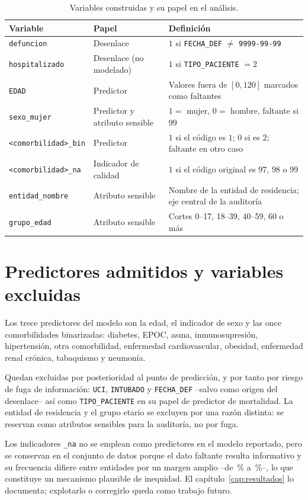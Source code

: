 \begin{table}[htbp]
\centering
\caption{Variables construidas y su papel en el análisis.}
\label{tab:derivadas}
\small
\setlength{\tabcolsep}{4pt}
\begin{tabular}{p{3.5cm} p{3.2cm} p{7.4cm}}
\toprule
Variable & Papel & Definición \\
\midrule
\texttt{defuncion} & Desenlace &
$1$ si \texttt{FECHA\_DEF} $\neq$ \texttt{9999-99-99} \\
\texttt{hospitalizado} & Desenlace (no modelado) &
$1$ si \texttt{TIPO\_PACIENTE} $=2$ \\
\texttt{EDAD} & Predictor &
Valores fuera de $[0,120]$ marcados como faltantes \\
\texttt{sexo\_mujer} & Predictor y atributo sensible &
$1=$ mujer, $0=$ hombre, faltante si $99$ \\
\texttt{<comorbilidad>\_bin} & Predictor &
$1$ si el código es $1$; $0$ si es $2$; faltante en otro caso \\
\texttt{<comorbilidad>\_na} & Indicador de calidad &
$1$ si el código original es $97$, $98$ o $99$ \\
\texttt{entidad\_nombre} & Atributo sensible &
Nombre de la entidad de residencia; eje central de la auditoría \\
\texttt{grupo\_edad} & Atributo sensible &
Cortes 0--17, 18--39, 40--59, 60 o más \\
\bottomrule
\end{tabular}
\end{table}

\section{Predictores admitidos y variables excluidas}

Los trece predictores del modelo son la edad, el indicador de sexo y las once
comorbilidades binarizadas: diabetes, EPOC, asma, inmunosupresión, hipertensión,
otra comorbilidad, enfermedad cardiovascular, obesidad, enfermedad renal crónica,
tabaquismo y neumonía.

Quedan excluidas por posterioridad al punto de predicción, y por tanto por riesgo
de fuga de información: \texttt{UCI}, \texttt{INTUBADO} y \texttt{FECHA\_DEF}
--salvo como origen del desenlace-- así como \texttt{TIPO\_PACIENTE} en su papel de
predictor de mortalidad. La entidad de residencia y el grupo etario se excluyen
por una razón distinta: se reservan como atributos sensibles para la auditoría, no
por fuga.

Los indicadores \texttt{\_na} no se emplean como predictores en el modelo
reportado, pero se conservan en el conjunto de datos porque el dato faltante
resulta informativo y su frecuencia difiere entre entidades por un margen amplio
--de \naEntMin\,\% a \naEntMax\,\%--, lo que constituye un mecanismo plausible de
inequidad. El capítulo~\ref{cap:resultados} lo documenta; explotarlo o corregirlo
queda como trabajo futuro.
